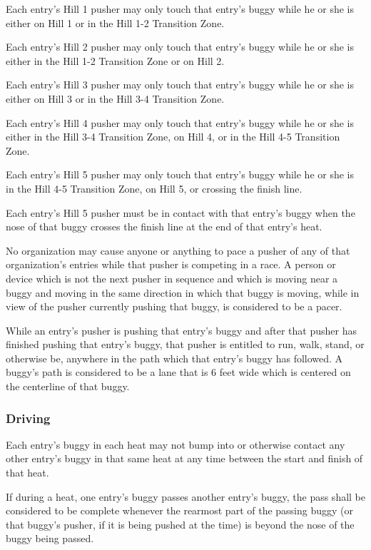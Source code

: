 	Each entry's Hill 1 pusher may only touch that entry's buggy while he or she is
	either on Hill 1 or in the Hill 1-2 Transition Zone.

	Each entry's Hill 2 pusher may only touch that entry's buggy while he or she is
	either in the Hill 1-2 Transition Zone or on Hill 2.

	Each entry's Hill 3 pusher may only touch that entry's buggy while he or she is
	either on Hill 3 or in the Hill 3-4 Transition Zone.

	Each entry's Hill 4 pusher may only touch that entry's buggy while he or she is
	either in the Hill 3-4 Transition Zone, on Hill 4, or in the Hill 4-5
	Transition Zone.

	Each entry's Hill 5 pusher may only touch that entry's buggy while he or she is
	in the Hill 4-5 Transition Zone, on Hill 5, or crossing the finish line.

	Each entry's Hill 5 pusher must be in contact with that entry's buggy when the
	nose of that buggy crosses the finish line at the end of that entry's heat.

	No organization may cause anyone or anything to pace a pusher of any of that
	organization's entries while that pusher is competing in a race. A person or
	device which is not the next pusher in sequence and which is moving near a
	buggy and moving in the same direction in which that buggy is moving, while in
	view of the pusher currently pushing that buggy, is considered to be a pacer.

	While an entry's pusher is pushing that entry's buggy and after that pusher has
	finished pushing that entry's buggy, that pusher is entitled to run, walk,
	stand, or otherwise be, anywhere in the path which that entry's buggy has
	followed. A buggy's path is considered to be a lane that is 6 feet wide which
	is centered on the centerline of that buggy.

\subsubsection{Driving}

	Each entry's buggy in each heat may not bump into or otherwise contact any
	other entry's buggy in that same heat at any time between the start and finish
	of that heat.

	If during a heat, one entry's buggy passes another entry's buggy, the pass
	shall be considered to be complete whenever the rearmost part of the passing
	buggy (or that buggy's pusher, if it is being pushed at the time) is beyond the
	nose of the buggy being passed.

